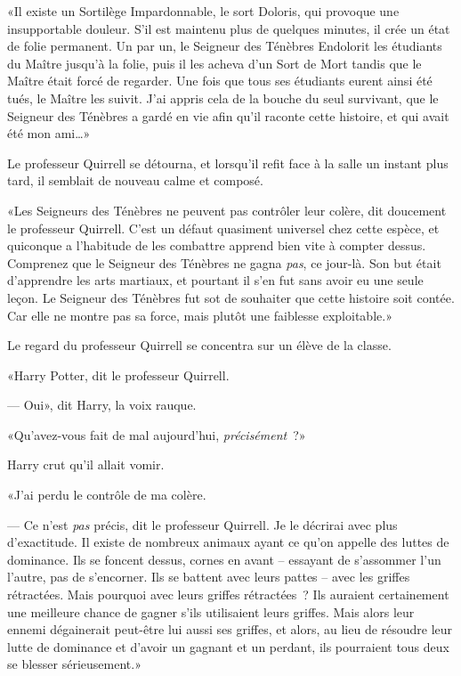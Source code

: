«Il existe un Sortilège Impardonnable, le sort Doloris, qui provoque une insupportable douleur. S'il est maintenu plus de quelques minutes, il crée un état de folie permanent. Un par un, le Seigneur des Ténèbres Endolorit les étudiants du Maître jusqu'à la folie, puis il les acheva d'un Sort de Mort tandis que le Maître était forcé de regarder. Une fois que tous ses étudiants eurent ainsi été tués, le Maître les suivit. J'ai appris cela de la bouche du seul survivant, que le Seigneur des Ténèbres a gardé en vie afin qu'il raconte cette histoire, et qui avait été mon ami…»

Le professeur Quirrell se détourna, et lorsqu'il refit face à la salle un instant plus tard, il semblait de nouveau calme et composé.

«Les Seigneurs des Ténèbres ne peuvent pas contrôler leur colère, dit doucement le professeur Quirrell. C'est un défaut quasiment universel chez cette espèce, et quiconque a l'habitude de les combattre apprend bien vite à compter dessus. Comprenez que le Seigneur des Ténèbres ne gagna \emph{pas}, ce jour-là. Son but était d'apprendre les arts martiaux, et pourtant il s'en fut sans avoir eu une seule leçon. Le Seigneur des Ténèbres fut sot de souhaiter que cette histoire soit contée. Car elle ne montre pas sa force, mais plutôt une faiblesse exploitable.»

Le regard du professeur Quirrell se concentra sur un élève de la classe.

«Harry Potter, dit le professeur Quirrell.

--- Oui», dit Harry, la voix rauque.

«Qu'avez-vous fait de mal aujourd'hui, \emph{précisément}~?»

Harry crut qu'il allait vomir.

«J'ai perdu le contrôle de ma colère.

--- Ce n'est \emph{pas} précis, dit le professeur Quirrell. Je le décrirai avec plus d'exactitude. Il existe de nombreux animaux ayant ce qu'on appelle des luttes de dominance. Ils se foncent dessus, cornes en avant -- essayant de s'assommer l'un l'autre, pas de s'encorner. Ils se battent avec leurs pattes -- avec les griffes rétractées. Mais pourquoi avec leurs griffes rétractées~? Ils auraient certainement une meilleure chance de gagner s'ils utilisaient leurs griffes. Mais alors leur ennemi dégainerait peut-être lui aussi ses griffes, et alors, au lieu de résoudre leur lutte de dominance et d'avoir un gagnant et un perdant, ils pourraient tous deux se blesser sérieusement.»

